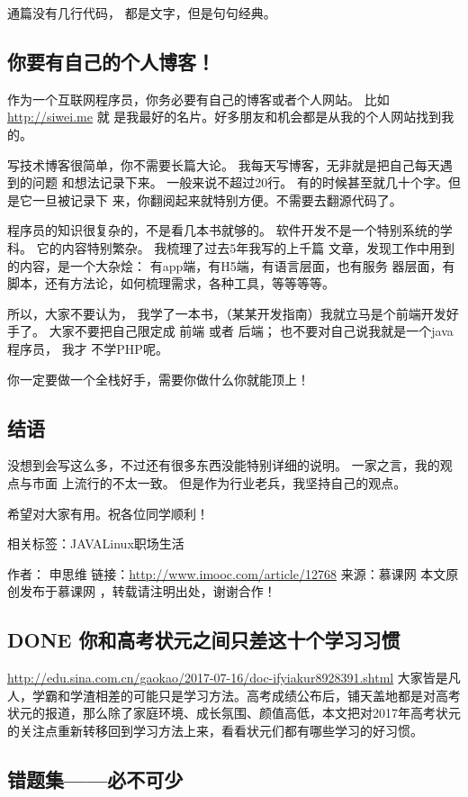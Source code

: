 \documentclass[11pt]{ctexart}
\begin{document}
{{{{通篇没有几行代码， 都是文字，但是句句经典。

\subsection{你要有自己的个人博客！}
\label{sec:org7466c55}
作为一个互联网程序员，你务必要有自己的博客或者个人网站。 比如 \url{http://siwei.me} 就
是我最好的名片。好多朋友和机会都是从我的个人网站找到我的。


写技术博客很简单，你不需要长篇大论。 我每天写博客，无非就是把自己每天遇到的问题
和想法记录下来。 一般来说不超过20行。 有的时候甚至就几十个字。但是它一旦被记录下
来，你翻阅起来就特别方便。不需要去翻源代码了。


程序员的知识很复杂的，不是看几本书就够的。
软件开发不是一个特别系统的学科。 它的内容特别繁杂。 我梳理了过去5年我写的上千篇
文章，发现工作中用到的内容，是一个大杂烩： 有app端，有H5端，有语言层面，也有服务
器层面，有脚本，还有方法论，如何梳理需求，各种工具，等等等等。


所以，大家不要认为， 我学了一本书，（某某开发指南）我就立马是个前端开发好手了。
大家不要把自己限定成 前端 或者 后端； 也不要对自己说我就是一个java程序员， 我才
不学PHP呢。


你一定要做一个全栈好手，需要你做什么你就能顶上！

\subsection{结语}
\label{sec:org2e6ffa3}
没想到会写这么多，不过还有很多东西没能特别详细的说明。 一家之言，我的观点与市面
上流行的不太一致。 但是作为行业老兵，我坚持自己的观点。


希望对大家有用。祝各位同学顺利！

相关标签：JAVALinux职场生活

作者： 申思维
链接：\url{http://www.imooc.com/article/12768}
来源：慕课网
本文原创发布于慕课网 ，转载请注明出处，谢谢合作！
\subsection{{\bfseries\sffamily DONE} 你和高考状元之间只差这十个学习习惯}
\label{sec:orge012efd}
\url{http://edu.sina.com.cn/gaokao/2017-07-16/doc-ifyiakur8928391.shtml}
大家皆是凡人，学霸和学渣相差的可能只是学习方法。高考成绩公布后，铺天盖地都是对高考状元的报道，那么除了家庭环境、成长氛围、颜值高低，本文把对2017年高考状元的关注点重新转移回到学习方法上来，看看状元们都有哪些学习的好习惯。
\subsection{错题集——必不可少}
\label{sec:org914fff4}

}}}}
\end{document}
